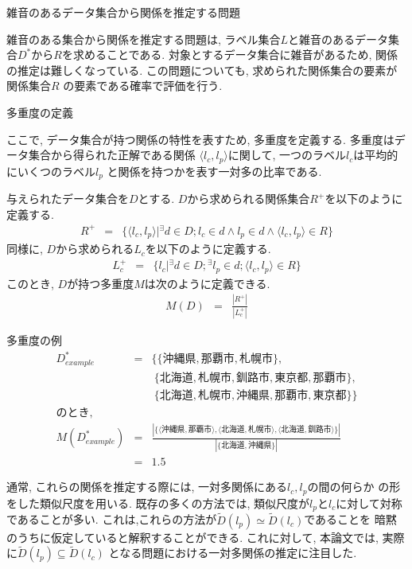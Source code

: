 \begin{df} 雑音のあるデータ集合から関係を推定する問題

雑音のある集合から関係を推定する問題は, ラベル集合$L$と雑音のあるデータ集
合$D^*$から$R$を求めることである.
対象とするデータ集合に雑音があるため, 関係の推定は難しくなっている. 
この問題についても, 求められた関係集合の要素が関係集合$R$
の要素である確率で評価を行う. 
\end{df}
\vspace{2zw}
\begin{df} 多重度の定義 

ここで, データ集合が持つ関係の特性を表すため, 多重度を定義する. 
多重度はデータ集合から得られた正解である関係
$\langle l_c,l_p\rangle$に関して, 
一つのラベル$l_c$は平均的にいくつのラベル$l_p$
と関係を持つかを表す一対多の比率である. 

与えられたデータ集合を$D$とする. 
$D$から求められる関係集合$R^+$を以下のように定義する. 
\begin{eqnarray*}
R^+ &=& \{\langle l_c,l_p\rangle |
{}^\exists d\in D;l_c\in d \wedge l_p\in d \wedge 
\langle l_c,l_p\rangle\in R \} 
\end{eqnarray*}
同様に, $D$から求められる$L_c$を以下のように定義する. 
\begin{eqnarray*}
L_c^+ &=& \{ l_c | {}^\exists d\in D;{}^\exists l_p\in d;
\langle l_c,l_p\rangle\in R\}
\end{eqnarray*}
このとき, $D$が持つ多重度$M$は次のように定義できる. 
\begin{eqnarray*} 
M(D) &=& \frac{|R^+|}{|L_c^+|} 
\end{eqnarray*} 
\label{multi}
\end{df}
\begin{ex} 多重度の例
\begin{eqnarray*}
D^*_{example} &=& \{\{沖縄県, 那覇市, 札幌市\}, \\
&& ~\{北海道, 札幌市, 釧路市, 東京都, 那覇市\}, \\
&& ~\{北海道, 札幌市, 沖縄県, 那覇市, 東京都\} \} \\
のとき, && \\
M(D^*_{example}) &=& 
\frac{|\{\langle 沖縄県,那覇市\rangle, \langle 北海道,札幌市\rangle, \langle 北海道,釧路市\rangle\} |}{|\{北海道, 沖縄県\}|} \\
&=& 1.5
\end{eqnarray*}
\end{ex}
通常, これらの関係を推定する際には, 一対多関係にある$l_c,l_p$の間の何らか
の形をした類似尺度を用いる.
既存の多くの方法では, 
類似尺度が$l_p$と$l_c$に対して対称であることが多い. 
これは,これらの方法が$\tilde{D}(l_p) \simeq \tilde{D}(l_c)$であることを
暗黙のうちに仮定していると解釈することができる. 
これに対して, 本論文では, 実際に$\tilde{D}(l_p) \subseteq \tilde{D}(l_c)$
となる問題における一対多関係の推定に注目した. 

